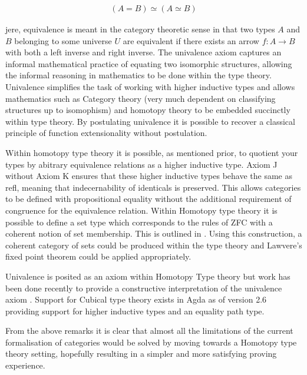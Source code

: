 \begin{align*}
    (A = B) \simeq (A \simeq B)
\end{align*}

jere, equivalence is meant in the category theoretic sense in that
two types $A$ and $B$ belonging to some universe $U$ are equivalent if there
exists an arrow $f : A \rightarrow B$ with both a left inverse and right
inverse. The univalence axiom captures an informal mathematical practice of
equating two isomorphic structures, allowing the informal reasoning in
mathematics to be done within the type theory. Univalence simplifies the task of
working with higher inductive types and allows mathematics such as Category
theory (very much dependent on classifying structures up to isomophism) and
homotopy theory to be embedded succinctly within type theory. By postulating
univalence it is possible to recover a classical principle of function
extensionality without postulation.

Within homotopy type theory it is possible, as mentioned prior, to quotient your
types by abitrary equivalence relations as a higher inductive type.
\textsf{Axiom J} without \textsf{Axiom K} ensures that these higher inductive
types behave the same as \textsf{refl}, meaning that indecernability of identicals
is preserved. This allows categories to be defined with propositional equality
without the additional requirement of congruence for the equivalence relation.
Within Homotopy type theory it is possible to define a set type which
corresponds to the rules of ZFC with a coherent notion of set membership. This
is outlined in . Using this construction, a coherent category of sets
could be produced within the type theory and Lawvere's fixed point theorem could
be applied appropriately.

Univalence is posited as an axiom within Homotopy Type theory but work has been
done recently to provide a constructive interpretation of the univalence axiom
.  Support for Cubical type theory exists in Agda as of version
2.6 providing support for higher inductive types and an equality path type.

From the above remarks it is clear that almost all the limitations of the
current formalisation of categories would be solved by moving towards a Homotopy
type theory setting, hopefully resulting in a simpler and more satisfying
proving experience.
